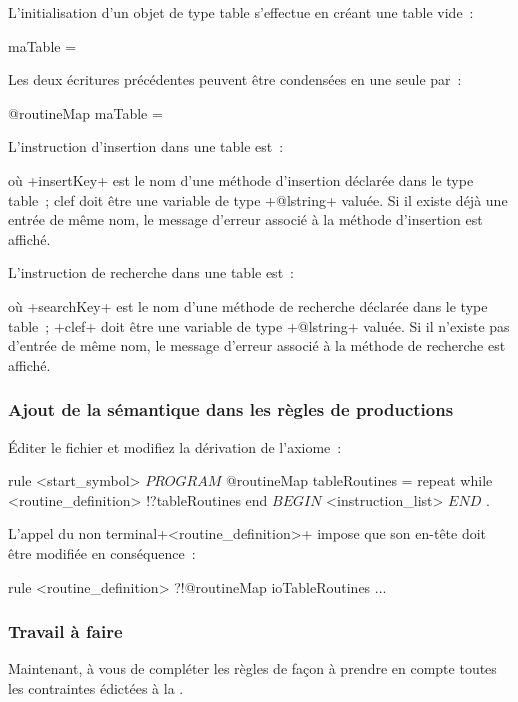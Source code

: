 L'initialisation d'un objet de type table s'effectue en créant une table vide~:
\begin{galgas3}
maTable = {}
\end{galgas3}

Les deux écritures précédentes peuvent être condensées en une seule par~:
\begin{galgas3}
@routineMap maTable = {}
\end{galgas3}

L'instruction d'insertion dans une table est~:
\begin{galgas3}
\end{galgas3}
où \ggst+insertKey+ est le nom d'une méthode d'insertion déclarée dans le type table~; clef doit être une variable de type \ggst+@lstring+ valuée. Si il existe déjà une entrée de même nom, le message d'erreur associé à la méthode d'insertion est affiché.

L'instruction de recherche dans une table est~:
\begin{galgas3}
\end{galgas3}
où \ggst+searchKey+ est le nom d'une méthode de recherche déclarée dans le type table~; \ggst+clef+ doit être une variable de type \ggst+@lstring+ valuée. Si il n'existe pas d'entrée de même nom, le message d'erreur associé à la méthode de recherche est affiché.

\subsubsection{Ajout de la sémantique dans les règles de productions}
Éditer le fichier  et modifiez la dérivation de l'axiome~:

\begin{galgas3}
rule <start_symbol> {
  $PROGRAM$
  @routineMap tableRoutines = {}
  repeat
  while
    <routine_definition> !?tableRoutines
  end
  $BEGIN$
  <instruction_list>
  $END$
  $.$
}
\end{galgas3}

L'appel du non terminal\ggst+<routine_definition>+ impose que son en-tête doit être modifiée en conséquence~:
\begin{galgas3}
rule <routine_definition> ?!@routineMap ioTableRoutines {
  ...
}
\end{galgas3}

\subsubsection{Travail à faire}
Maintenant, à vous de compléter les règles de façon à prendre en compte toutes les contraintes édictées à la .

